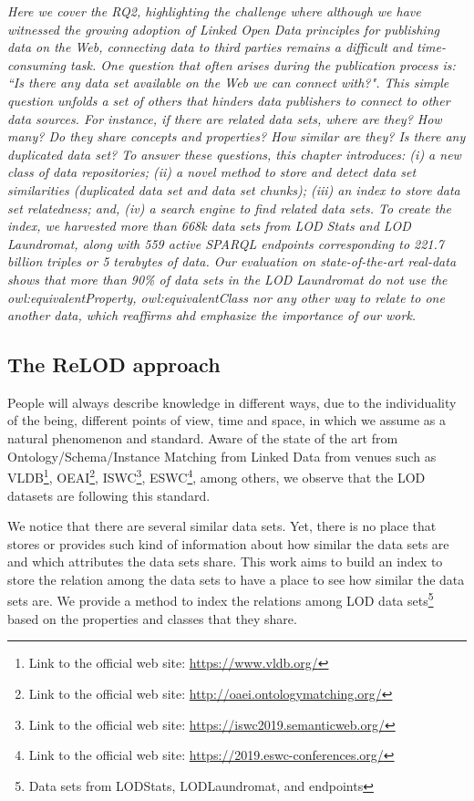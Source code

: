 \textit{Here we cover the RQ2, highlighting the challenge where although we have witnessed the growing adoption of Linked Open Data principles for publishing data on the Web, connecting data to third parties remains a difficult and time-consuming task. One question that often arises during the publication process is: ``Is there any data set available on the Web we can connect with?". This simple question unfolds a set of others that hinders data publishers to connect to other data sources. For instance, if there are related data sets, where are they? How many? Do they share concepts and properties? How similar are they? Is there any duplicated data set?
To answer these questions, this chapter introduces: (i) a new class of data repositories; (ii) a novel method to store and detect data set similarities (duplicated data set and data set chunks); (iii) an index to store data set relatedness; and, (iv) a search engine to find related data sets.
To create the index, we harvested more than 668k data sets from LOD Stats and LOD Laundromat, along with 559 active SPARQL endpoints corresponding to 221.7 billion triples or 5 terabytes of data. 
Our evaluation on state-of-the-art real-data shows that more than 90\% of data sets in the LOD Laundromat do not use the \textit{owl:equivalentProperty}, \textit{owl:equivalentClass} nor any other way to relate to one another data, which reaffirms ahd emphasize the importance of our work.}

\subsection{The ReLOD approach}
People will always describe knowledge in different ways, due to the individuality of the being, different points of view, time and space, in which we assume as a natural phenomenon and standard. Aware of the state of the art from Ontology/Schema/Instance Matching from Linked Data from venues such as \ac{VLDB}\footnote{Link to the official web site: \url{https://www.vldb.org/}}, \ac{OEAI}\footnote{Link to the official web site: \url{http://oaei.ontologymatching.org/}}, \ac{ISWC}\footnote{Link to the official web site: \url{https://iswc2019.semanticweb.org/}}, \ac{ESWC}\footnote{Link to the official web site: \url{https://2019.eswc-conferences.org/}}, among others, we observe that the \ac{LOD} datasets are following this standard.

We notice that there are several similar data sets. Yet, there is no place that stores or provides such kind of information about how similar the data sets are and which attributes the data sets share. This work aims to build an index to store the relation among the data sets to have a place to see how similar the data sets are. We provide a method to index the relations among LOD data sets\footnote{Data sets from LODStats, LODLaundromat, and endpoints} based on the properties and classes that they share.

